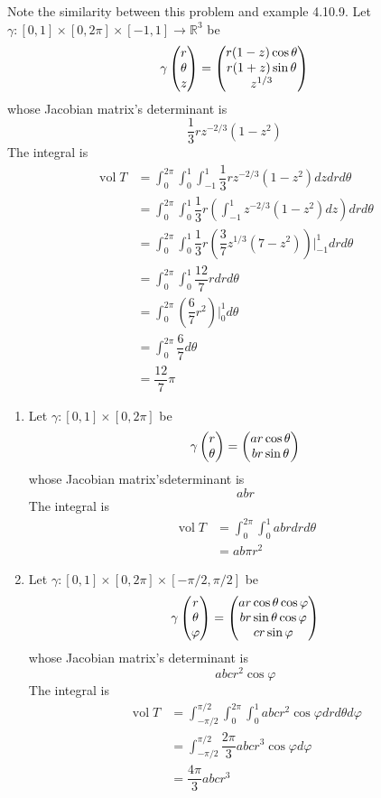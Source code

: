 \documentclass{homework}
\DeclareMathOperator{\vol}{vol}
\begin{document}
\begin{problem}{4}
Note the similarity between this problem and example 4.10.9. Let
$\gamma : [0, 1] \times [0, 2\pi] \times [-1, 1] \to \mathbb{R}^3$ be
$$\gamma \begin{pmatrix}r\\\theta\\z\end{pmatrix} = \begin{pmatrix}
r(1-z)\cos\theta\\
r(1+z)\sin\theta\\
z^{1/3}\end{pmatrix}$$
whose Jacobian matrix's determinant is
$$\dfrac{1}{3}rz^{-2/3}(1-z^2)$$
The integral is
\begin{align*}
\vol{T}
&= \int_0^{2\pi}\int_0^1\int_{-1}^1 \dfrac{1}{3}rz^{-2/3}(1-z^2) dzdrd\theta
\\
&= \int_0^{2\pi}\int_0^1 \dfrac{1}{3}r(\int_{-1}^1 z^{-2/3}(1-z^2)dz)drd\theta
\\
&= \int_0^{2\pi}\int_0^1 \dfrac{1}{3}r
(\dfrac{3}{7}z^{1/3}(7-z^2))|^1_{-1}
drd\theta
\\
&= \int_0^{2\pi}\int_0^1 \dfrac{12}{7}r drd\theta \\
&= \int_0^{2\pi} (\dfrac{6}{7}r^2)|_0^1 d\theta \\
&= \int_0^{2\pi} \dfrac{6}{7} d\theta \\
&= \dfrac{12}{7} \pi
\end{align*}
\end{problem}

\begin{problem}{5}
\begin{enumerate}
\item
Let $\gamma : [0, 1] \times [0, 2\pi]$ be
$$\gamma \begin{pmatrix}r\\\theta\end{pmatrix} = \begin{pmatrix}ar\cos\theta\\br\sin\theta\end{pmatrix}$$
whose Jacobian matrix'sdeterminant is
$$abr$$
The integral is
\begin{align*}
\vol{T}
&= \int_0^{2\pi}\int_0^1 abr drd\theta \\
&= ab\pi r^2
\end{align*}
\item
Let $\gamma : [0, 1] \times [0, 2\pi] \times [-\pi/2, \pi/2]$ be
$$\gamma \begin{pmatrix}r\\\theta\\\varphi\end{pmatrix} = \begin{pmatrix}
ar\cos\theta\cos\varphi \\
br\sin\theta\cos\varphi \\
cr\sin\varphi\end{pmatrix}$$
whose Jacobian matrix's determinant is
$$abcr^2\cos\varphi$$
The integral is
\begin{align*}
\vol{T}
&= \int_{-\pi/2}^{\pi/2}\int_0^{2\pi}\int_0^1 abcr^2\cos\varphi drd\theta d\varphi \\
&= \int_{-\pi/2}^{\pi/2}\dfrac{2\pi}{3}abcr^3\cos\varphi d\varphi \\
&= \dfrac{4\pi}{3} abcr^3
\end{align*}
\end{enumerate}
\end{problem}
\end{document}
